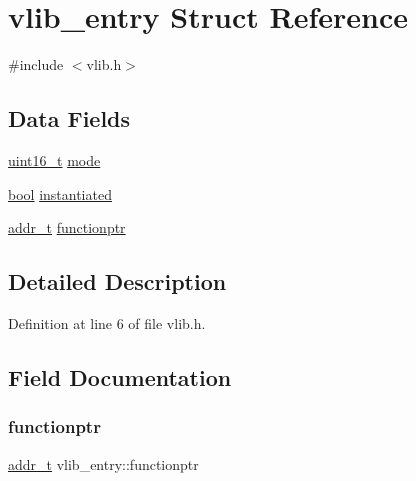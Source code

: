 \hypertarget{a00191}{}\section{vlib\+\_\+entry Struct Reference}
\label{a00191}


{\ttfamily \#include $<$vlib.\+h$>$}

\subsection*{Data Fields}
\begin{DoxyCompactItemize}
\item 
\hyperlink{a00104_a273cf69d639a59973b6019625df33e30_a273cf69d639a59973b6019625df33e30}{uint16\+\_\+t} \hyperlink{a00191_a46df5a47ac05a46ce871e5132153949c_a46df5a47ac05a46ce871e5132153949c}{mode}
\item 
\hyperlink{a00104_af6a258d8f3ee5206d682d799316314b1_af6a258d8f3ee5206d682d799316314b1}{bool} \hyperlink{a00191_ab67e2f60e6622a2d0b7c8a3ac6fd7c71_ab67e2f60e6622a2d0b7c8a3ac6fd7c71}{instantiated}
\item 
\hyperlink{a00104_a295f71165288684c38c6bb836fbb3c59_a295f71165288684c38c6bb836fbb3c59}{addr\+\_\+t} \hyperlink{a00191_abf69fb4a112a5bf0ccf2b441c1038f0d_abf69fb4a112a5bf0ccf2b441c1038f0d}{functionptr}
\end{DoxyCompactItemize}


\subsection{Detailed Description}


Definition at line 6 of file vlib.\+h.



\subsection{Field Documentation}
\mbox{\label{a00191_abf69fb4a112a5bf0ccf2b441c1038f0d_abf69fb4a112a5bf0ccf2b441c1038f0d}} 
\subsubsection{\texorpdfstring{functionptr}{functionptr}}
{\footnotesize\ttfamily \hyperlink{a00104_a295f71165288684c38c6bb836fbb3c59_a295f71165288684c38c6bb836fbb3c59}{addr\+\_\+t} vlib\+\_\+entry\+::functionptr}



